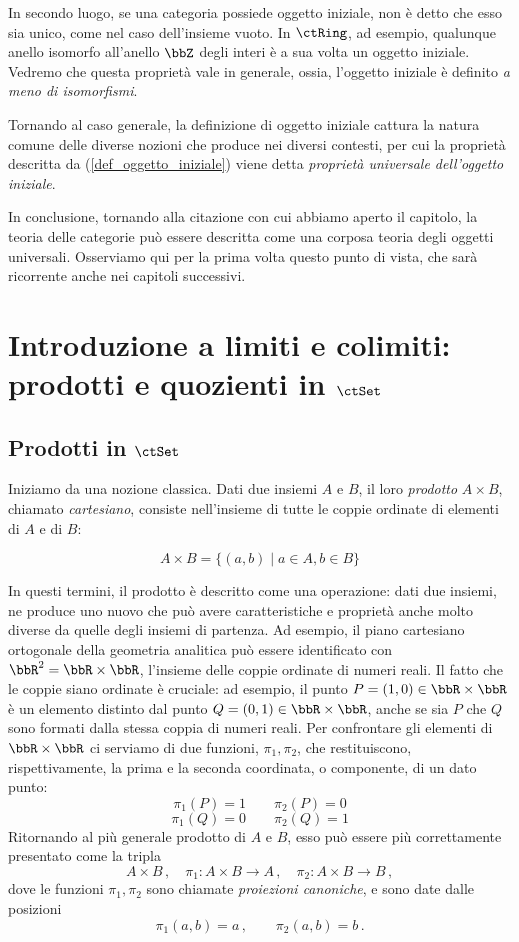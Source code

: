 In secondo luogo, se una categoria possiede oggetto iniziale, non è detto che esso sia unico, come nel caso dell'insieme vuoto. In \(\ctRing\), ad esempio, qualunque anello isomorfo all'anello  \(\bbZ\) degli interi è a sua volta un oggetto iniziale. Vedremo che questa proprietà vale in generale, ossia, l'oggetto iniziale è definito \emph{a meno di isomorfismi}.

Tornando al caso generale, la definizione di oggetto iniziale cattura la natura comune delle diverse nozioni che produce nei diversi contesti, per cui la proprietà descritta da (\ref{def_oggetto_iniziale}) viene detta \emph{proprietà universale dell'oggetto iniziale}.



In conclusione, tornando alla citazione con cui abbiamo aperto il capitolo, la teoria delle categorie può essere descritta come una corposa teoria degli oggetti universali. Osserviamo qui per la prima volta questo punto di vista, che sarà ricorrente anche nei capitoli successivi.





\section{Introduzione a limiti e colimiti: prodotti e quozienti in \(\ctSet\)}

\subsection*{Prodotti in \(\ctSet\)}\label{prod_in_Set}

Iniziamo da una nozione classica. 
Dati due insiemi \(A\) e \(B\), il loro \emph{prodotto} \(A\times B\), chiamato \emph{cartesiano}, consiste nell'insieme di tutte le coppie ordinate di elementi di \(A\) e di \(B\):

\[
	A\times B= \{(a,b)\mid a\in A, b\in B\}
\]

In questi termini, il prodotto è descritto come una operazione: dati due insiemi, ne produce uno nuovo che può avere caratteristiche e proprietà anche molto diverse da quelle degli insiemi di partenza. Ad esempio, il piano cartesiano ortogonale della geometria analitica può essere identificato con \(\bbR^2=\bbR\times\bbR\), l'insieme delle coppie ordinate di numeri reali. Il fatto che le coppie siano ordinate è cruciale: ad esempio, il punto \(P=(1,0)\in \bbR\times\bbR\) è un elemento distinto dal punto \(Q=(0,1)\in \bbR\times\bbR\), anche se sia $P$ che $Q$ sono formati dalla stessa coppia di numeri reali. Per confrontare gli elementi di \(\bbR\times\bbR\) ci serviamo di due funzioni, \(\pi_1,\pi_2\), che restituiscono, rispettivamente, la prima e la seconda coordinata, o componente, di un dato punto:
\[
	\pi_1(P)=1\qquad \pi_2(P)=0
\]
\[
	\pi_1(Q)=0\qquad \pi_2(Q)=1
\]
Ritornando al più generale prodotto di \(A\) e \(B\), esso può essere più correttamente presentato come la tripla
\[
	A\times B\,,\quad \pi_1\colon A\times B\to A\,,\quad \pi_2\colon A\times B\to B\,,
\]
dove le funzioni \(\pi_1,\pi_2\) sono chiamate \emph{proiezioni canoniche}, e sono date dalle posizioni
\[
	\pi_1(a,b)=a\,,\qquad \pi_2(a,b)=b\,.
\]


